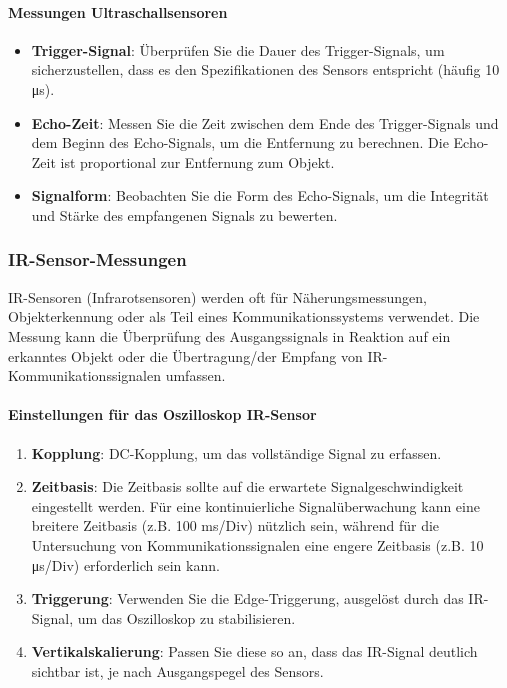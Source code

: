 \documentclass{vorlage-design-main}
\begin{document}
\hypertarget{messungen-ultraschallsensoren}{%
\paragraph{Messungen
Ultraschallsensoren}\label{messungen-ultraschallsensoren}}

\begin{itemize}

\item
  \textbf{Trigger-Signal}: Überprüfen Sie die Dauer des Trigger-Signals,
  um sicherzustellen, dass es den Spezifikationen des Sensors entspricht
  (häufig 10 μs).
\item
  \textbf{Echo-Zeit}: Messen Sie die Zeit zwischen dem Ende des
  Trigger-Signals und dem Beginn des Echo-Signals, um die Entfernung zu
  berechnen. Die Echo-Zeit ist proportional zur Entfernung zum Objekt.
\item
  \textbf{Signalform}: Beobachten Sie die Form des Echo-Signals, um die
  Integrität und Stärke des empfangenen Signals zu bewerten.
\end{itemize}

\hypertarget{ir-sensor-messungen}{%
\subsubsection{IR-Sensor-Messungen}\label{ir-sensor-messungen}}

IR-Sensoren (Infrarotsensoren) werden oft für Näherungsmessungen,
Objekterkennung oder als Teil eines Kommunikationssystems verwendet. Die
Messung kann die Überprüfung des Ausgangssignals in Reaktion auf ein
erkanntes Objekt oder die Übertragung/der Empfang von
IR-Kommunikationssignalen umfassen.

\hypertarget{einstellungen-fuxfcr-das-oszilloskop-ir-sensor}{%
\paragraph{Einstellungen für das Oszilloskop
IR-Sensor}\label{einstellungen-fuer-das-oszilloskop-ir-sensor}}

\begin{enumerate}
\def\labelenumi{\arabic{enumi}.}

\item
  \textbf{Kopplung}: DC-Kopplung, um das vollständige Signal zu
  erfassen.
\item
  \textbf{Zeitbasis}: Die Zeitbasis sollte auf die erwartete
  Signalgeschwindigkeit eingestellt werden. Für eine kontinuierliche
  Signalüberwachung kann eine breitere Zeitbasis (z.B. 100 ms/Div)
  nützlich sein, während für die Untersuchung von Kommunikationssignalen
  eine engere Zeitbasis (z.B. 10 μs/Div) erforderlich sein kann.
\item
  \textbf{Triggerung}: Verwenden Sie die Edge-Triggerung, ausgelöst
  durch das IR-Signal, um das Oszilloskop zu stabilisieren.
\item
  \textbf{Vertikalskalierung}: Passen Sie diese so an, dass das
  IR-Signal deutlich sichtbar ist, je nach Ausgangspegel des Sensors.
\end{enumerate}
\end{document}
